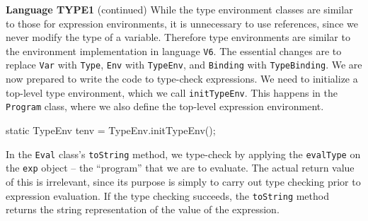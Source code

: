 \begin{minipage}[t]{\sw}
\slidenumber
\LARGE
{\bf Language TYPE1} (continued)\exx
While the type environment classes are similar
to those for expression environments,
it is unnecessary to use references,
since we never modify the type of a variable.
Therefore type environments are similar
to the environment implementation in language \verb'V6'.
The essential changes are to replace \verb'Var' with \verb'Type',
\verb'Env' with \verb'TypeEnv',
and \verb'Binding' with \verb'TypeBinding'.\exx
We are now prepared to write the code to type-check expressions.
We need to initialize a top-level type environment,
which we call \verb'initTypeEnv'.
This happens in the \verb'Program' class,
where we also define the top-level expression environment.
\Large
\begin{qv}
    static TypeEnv tenv = TypeEnv.initTypeEnv();
\end{qv}
\LARGE
In the \verb'Eval' class's \verb'toString' method,
we type-check by applying the \verb'evalType' on the \verb'exp' object
-- the ``program'' that we are to evaluate.
The actual return value of this is irrelevant,
since its purpose is simply to carry out type checking
prior to expression evaluation.
If the type checking succeeds,
the \verb'toString' method returns the string representation
of the value of the expression.
\Large
\begin{qv}
    public String toString() {
        exp.evalType(Program.tenv); // type check, then ...
        return exp.eval(Program.env).toString(); // ... evaluate
    }
}
\end{qv}
\end{minipage}
